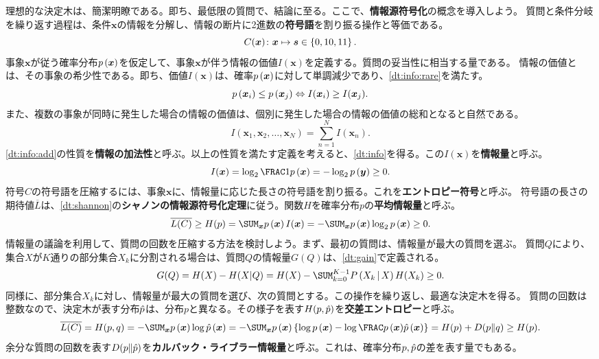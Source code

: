 \documentclass[10pt,a4paper]{book}
\begin{document}
理想的な決定木は、簡潔明瞭である。即ち、最低限の質問で、結論に至る。ここで、\textbf{情報源符号化}の概念を導入しよう。
質問と条件分岐を繰り返す過程は、条件$\bm{x}$の情報を分解し、情報の断片に2進数の\textbf{符号語}を割り振る操作と等価である。
%
\begin{equation}
C(\bm{x}) \colon \bm{x} \mapsto \bm{s} \in \seq{0, 10, 11}.
\end{equation}
%
事象$\bm{x}$が従う確率分布$\prob{\bm{x}}$を仮定して、事象$\bm{x}$が伴う情報の価値$I(\bm{x})$を定義する。質問の妥当性に相当する量である。
情報の価値とは、その事象の希少性である。即ち、価値$I(\bm{x})$は、確率$\prob{\bm{x}}$に対して単調減少であり、\eqref{dt:info:rare}を満たす。
%
\begin{equation}
\label{eq:dt:info:rare}
\prob{\bm{x}_i} \leq \prob{\bm{x}_j} \Leftrightarrow I(\bm{x}_i) \geq I(\bm{x}_j).
\end{equation}
%
また、複数の事象が同時に発生した場合の情報の価値は、個別に発生した場合の情報の価値の総和となると自然である。
%
\begin{equation}
\label{eq:dt:info:add}
I(\bm{x}_1,\bm{x}_2,\ldots,\bm{x}_N) = \sum_{n=1}^N I(\bm{x}_n).
\end{equation}
%
\eqref{dt:info:add}の性質を\textbf{情報の加法性}と呼ぶ。以上の性質を満たす定義を考えると、\eqref{dt:info}を得る。この$I(\bm{x})$を\textbf{情報量}と呼ぶ。
%
\begin{equation}
\label{eq:dt:info}
I(\bm{x}) = \log_2 \frac{1}{\prob{\bm{x}}} = - \log_2 \prob{\bm{y}} \geq 0.
\end{equation}
%
符号$C$の符号語を圧縮するには、事象$\bm{x}$に、情報量に応じた長さの符号語を割り振る。これを\textbf{エントロピー符号}と呼ぶ。
符号語の長さの期待値$\overline{L}$は、\eqref{dt:shannon}の\textbf{シャノンの情報源符号化定理}に従う。関数$H$を確率分布$p$の\textbf{平均情報量}と呼ぶ。
%
\begin{equation}
\label{eq:dt:shannon}
\overline{L(C)} \geq H(p) = \sum_{\bm{x}} \prob{\bm{x}} I(\bm{x}) = -\sum_{\bm{x}} \prob{\bm{x}} \log_2 \prob{\bm{x}} \geq 0.
\end{equation}
%
情報量の議論を利用して、質問の回数を圧縮する方法を検討しよう。まず、最初の質問は、情報量が最大の質問を選ぶ。
質問$Q$により、集合$X$が$K$通りの部分集合$X_k$に分割される場合は、質問$Q$の情報量$G(Q)$は、\eqref{dt:gain}で定義される。
%
\begin{equation}
\label{eq:dt:gain}
G(Q) = H(X) - H(X|Q) = H(X) - \sum_{k=0}^{K-1} \Prob{X_k}[X] H(X_k) \geq 0.
\end{equation}
%
同様に、部分集合$X_k$に対し、情報量が最大の質問を選び、次の質問とする。この操作を繰り返し、最適な決定木を得る。
質問の回数は整数なので、決定木が表す分布$\hat{p}$は、分布$p$と異なる。その様子を表す$H(p,\hat{p})$を\textbf{交差エントロピー}と呼ぶ。
%
\begin{equation}
\label{eq:dt:KL}
\overline{L(C)} = H(p,q) =
-\sum_{\bm{x}} \prob{\bm{x}} \log \hatprob{\bm{x}} =
-\sum_{\bm{x}} \prob{\bm{x}} \left\{\log \prob{\bm{x}} - \log\frac{\prob{\bm{x}}}{\hatprob{\bm{x}}}\right\} =
H(p) + \KL{p}{q} \geq H(p).
\end{equation}
%
余分な質問の回数を表す$D\!\left(p\|\hat{p}\right)$を\textbf{カルバック・ライブラー情報量}と呼ぶ。これは、確率分布$p,\hat{p}$の差を表す量でもある。
\end{document}
